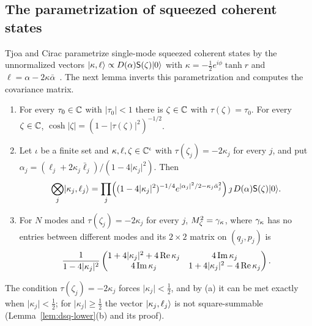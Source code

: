 \begin{veteenv}
\subsection{The parametrization of squeezed coherent states}\label{sec:pg-invert}

Tjoa and Cirac parametrize single-mode squeezed coherent states by the unnormalized vectors $\lvert \kappa,\ell\rangle\propto
D(\alpha)\mathsf S(\zeta)\lvert 0\rangle$ with $\kappa=-\frac12e^{i\phi}\tanh r$ and $\ell=\alpha-2\kappa\bar\alpha$~\cite[(8)]{tjoacirac}. The next lemma inverts
this parametrization and computes the covariance matrix.

\begin{lemma}\label{lem:pg-invert}
\begin{enumerate}
\item[(a)] For every $\tau_0\in\mathbb C$ with $\lvert\tau_0\rvert<1$ there is $\zeta\in\mathbb C$ with $\tau(\zeta)=\tau_0$. For every $\zeta\in\mathbb C$,
$\cosh\lvert\zeta\rvert=(1-\lvert\tau(\zeta)\rvert^2)^{-1/2}$.
\item[(b)] Let $\iota$ be a finite set and $\kappa,\ell,\zeta\in\mathbb C^\iota$ with $\tau(\zeta_j)=-2\kappa_j$ for every $j$, and put
$\alpha_j=(\ell_j+2\kappa_j\bar\ell_j)/(1-4\lvert\kappa_j\rvert^2)$. Then
\[
 \bigotimes_j\lvert \kappa_j,\ell_j\rangle=\prod_j\Bigl((1-4\lvert\kappa_j\rvert^2)^{-1/4}e^{\lvert\alpha_j\rvert^2/2-\kappa_j\bar\alpha_j^2}\Bigr)\,
 \jmath\,D(\alpha)\mathsf S(\zeta)\lvert 0\rangle .
\]
\item[(c)] For $N$ modes and $\tau(\zeta_j)=-2\kappa_j$ for every $j$, $M_\zeta^2=\gamma_\kappa$, where $\gamma_\kappa$ has no entries between different modes and
its $2\times2$ matrix on $(q_j,p_j)$ is
\[
 \frac1{1-4\lvert\kappa_j\rvert^2}\begin{pmatrix}1+4\lvert\kappa_j\rvert^2+4\operatorname{Re}\kappa_j&4\operatorname{Im}\kappa_j\\
 4\operatorname{Im}\kappa_j&1+4\lvert\kappa_j\rvert^2-4\operatorname{Re}\kappa_j\end{pmatrix}.
\]
\end{enumerate}
\end{lemma}

The condition $\tau(\zeta_j)=-2\kappa_j$ forces $\lvert\kappa_j\rvert<\frac12$, and by (a) it can be met exactly when $\lvert\kappa_j\rvert<\frac12$; for
$\lvert\kappa_j\rvert\ge\frac12$ the vector $\lvert \kappa_j,\ell_j\rangle$ is not square-summable (Lemma~\ref{lem:dsq-lower}(b) and its proof).


\end{veteenv}
